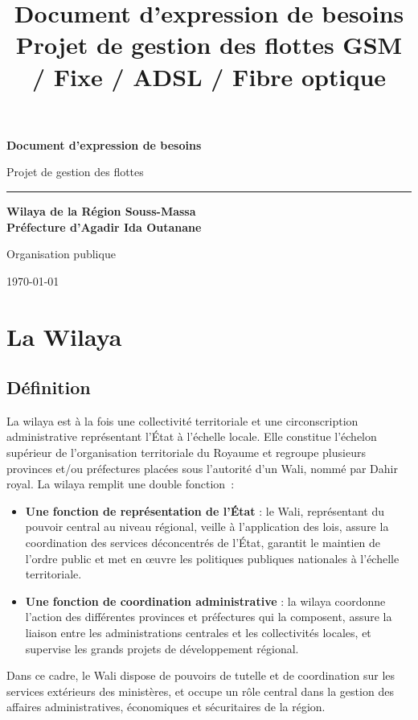 \documentclass[11pt,a4paper]{article}
\title{\textbf{\Huge Document d'expression de besoins}\\[0.5em]
\Large Projet de gestion des flottes GSM / Fixe / ADSL / Fibre optique}
\author{}
\date{}
\begin{document}
\begin{titlepage}
\centering
\vspace*{2cm}
{\Huge\bfseries\color{primaryblue} Document d'expression de besoins\par}
\vspace{1cm}
{\Large Projet de gestion des flottes\par}
\vspace{1.5cm}
{\color{primaryblue}\rule{0.6\textwidth}{0.4pt}\par}
\vspace{1.5cm}
{\large\bfseries Wilaya de la Région Souss-Massa\\
Préfecture d'Agadir Ida Outanane\par}
\vspace{2cm}
{\normalsize Organisation publique\par}
\vspace{0.5cm}
{\normalsize \today\par}

\vfill
\end{titlepage}

\tableofcontents
\thispagestyle{fancy}
\newpage

\section{La Wilaya}

\subsection{Définition}
La wilaya est à la fois une collectivité territoriale et une circonscription administrative représentant l'État à l'échelle locale. Elle constitue l'échelon supérieur de l'organisation territoriale du Royaume et regroupe plusieurs provinces et/ou préfectures placées sous l'autorité d'un Wali, nommé par Dahir royal.
La wilaya remplit une double fonction~:
\begin{itemize}
\item \textbf{Une fonction de représentation de l'État} : le Wali, représentant du pouvoir central au niveau régional, veille à l'application des lois, assure la coordination des services déconcentrés de l'État, garantit le maintien de l'ordre public et met en œuvre les politiques publiques nationales à l'échelle territoriale.
\item \textbf{Une fonction de coordination administrative} : la wilaya coordonne l'action des différentes provinces et préfectures qui la composent, assure la liaison entre les administrations centrales et les collectivités locales, et supervise les grands projets de développement régional.
\end{itemize}
Dans ce cadre, le Wali dispose de pouvoirs de tutelle et de coordination sur les services extérieurs des ministères, et occupe un rôle central dans la gestion des affaires administratives, économiques et sécuritaires de la région.
\end{document}
